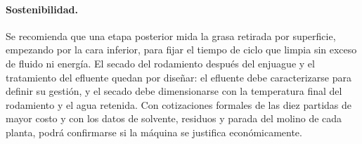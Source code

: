 \paragraph{Sostenibilidad.} Se recomienda que una etapa posterior mida la grasa retirada por superficie, empezando por la cara inferior, para fijar el tiempo de ciclo que limpia sin exceso de fluido ni energía. El secado del rodamiento después del enjuague y el tratamiento del efluente quedan por diseñar: el efluente debe caracterizarse para definir su gestión, y el secado debe dimensionarse con la temperatura final del rodamiento y el agua retenida. Con cotizaciones formales de las diez partidas de mayor costo y con los datos de solvente, residuos y parada del molino de cada planta, podrá confirmarse si la máquina se justifica económicamente.
